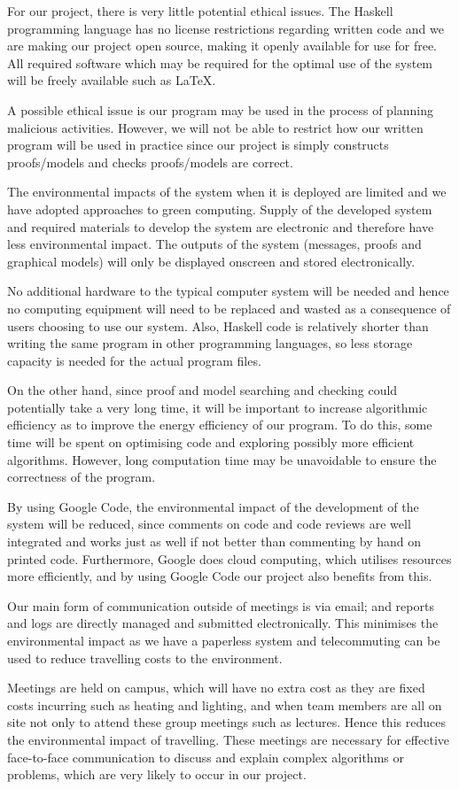 For our project, there is very little potential ethical issues. The Haskell programming language has no license restrictions regarding written code and we are making our project open source, making it openly available for use for free. All required software which may be required for the optimal use of the system will be freely available such as \LaTeX{}.

A possible ethical issue is our program may be used in the process of planning malicious activities. However, we will not be able to restrict how our written program will be used in practice since our project is simply constructs proofs/models and checks proofs/models are correct.

The environmental impacts of the system when it is deployed are limited and we have adopted approaches to green computing. Supply of the developed system and required materials to develop the system are electronic and therefore have less environmental impact. The outputs of the system (messages, proofs and graphical models) will only be displayed onscreen and stored electronically.

No additional hardware to the typical computer system will be needed and hence no computing equipment will need to be replaced and wasted as a consequence of users choosing to use our system. Also, Haskell code is relatively shorter than writing the same program in other programming languages, so less storage capacity is needed for the actual program files.

On the other hand, since proof and model searching and checking could potentially take a very long time, it will be important to increase algorithmic efficiency as to improve the energy efficiency of our program. To do this, some time will be spent on optimising code and exploring possibly more efficient algorithms. However, long computation time may be unavoidable to ensure the correctness of the program.

By using Google Code, the environmental impact of the development of the system will be reduced, since comments on code and code reviews are well integrated and works just as well if not better than commenting by hand on printed code. Furthermore, Google does cloud computing, which utilises resources more efficiently, and by using Google Code our project also benefits from this.

Our main form of communication outside of meetings is via email; and reports and logs are directly managed and submitted electronically. This minimises the environmental impact as we have a paperless system and telecommuting can be used to reduce travelling costs to the environment.

Meetings are held on campus, which will have no extra cost as they are fixed costs incurring such as heating and lighting, and when team members are all on site not only to attend these group meetings such as lectures. Hence this reduces the environmental impact of travelling. These meetings are necessary for effective face-to-face communication to discuss and explain complex algorithms or problems, which are very likely to occur in our project.
